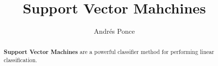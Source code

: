 \documentclass{tufte-handout}
\title{Support Vector Mahchines}
\author{Andr\'es Ponce}
\begin{document}
\maketitle

\begin{abstract}
\textbf{Support Vector Machines} are a powerful classifier 
method for performing linear classification.
\end{abstract}
\end{document}
